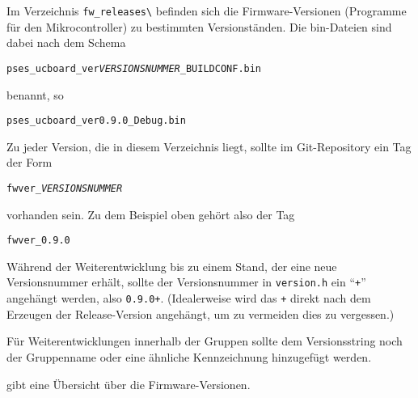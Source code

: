 Im Verzeichnis \verb|fw_releases\| befinden sich die Firmware-Versionen (Programme für den Mikrocontroller) zu bestimmten Versionständen. Die bin-Dateien sind dabei nach dem Schema
\begin{center}
	\texttt{pses\_ucboard\_ver\textit{VERSIONSNUMMER}\_\texttt{BUILDCONF}.bin}
\end{center}
benannt, so \zB
\begin{center}
	\texttt{pses\_ucboard\_ver0.9.0\_Debug.bin}
\end{center}

Zu jeder Version, die in diesem Verzeichnis liegt, sollte im Git-Repository ein Tag der Form
\begin{center}
	\texttt{fwver\_\textit{VERSIONSNUMMER}}
\end{center}
vorhanden sein. Zu dem Beispiel oben gehört also der Tag
\begin{center}
	\texttt{fwver\_0.9.0}
\end{center}

Während der Weiterentwicklung bis zu einem Stand, der eine neue Versionsnummer erhält, sollte der Versionsnummer in \verb|version.h| ein "`\verb|+|"' angehängt werden, also \zB \verb|0.9.0+|. (Idealerweise wird das \verb|+| direkt nach dem Erzeugen der Release-Version angehängt, um zu vermeiden dies zu vergessen.)

Für Weiterentwicklungen innerhalb der Gruppen sollte dem Versionsstring noch der Gruppenname oder eine ähnliche Kennzeichnung hinzugefügt werden.


 gibt eine Übersicht über die Firmware-Versionen.

